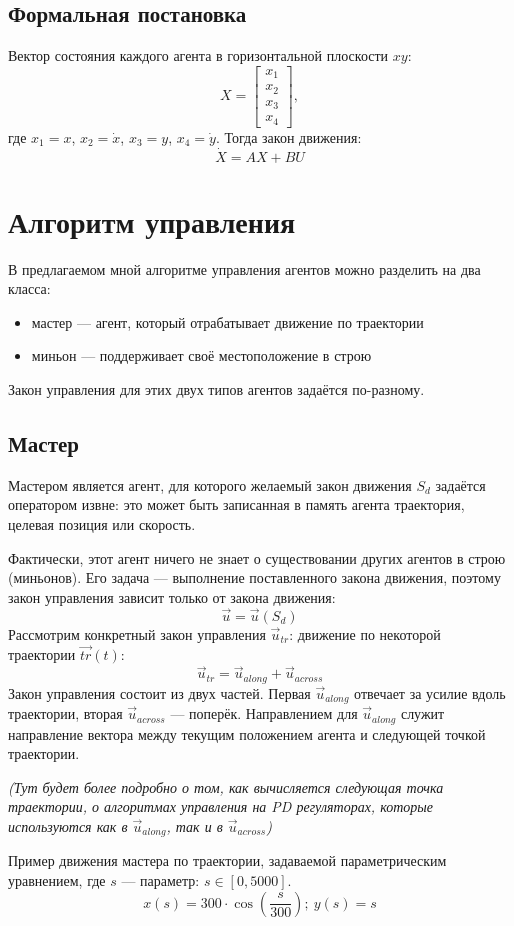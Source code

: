 \documentclass[12pt,a4paper]{article}
\begin{document}
\subsection{Формальная постановка}
Вектор состояния каждого агента в горизонтальной плоскости $xy$:
$$ X = 
\begin{bmatrix}
	x_1 \\
	x_2 \\
	x_3 \\
	x_4
\end{bmatrix} ,
$$
где $x_1 = x$, $x_2 = \dot{x}$, $x_3 = y$, $x_4 = \dot{y}$. Тогда закон движения:
$$\dot{X} = AX + BU$$

\section{Алгоритм управления}
В предлагаемом мной алгоритме управления агентов можно разделить на два класса:
\begin{itemize}
	\item мастер — агент, который отрабатывает движение по траектории
	\item миньон — поддерживает своё местоположение в строю
\end{itemize}
Закон управления для этих двух типов агентов задаётся по-разному.
\subsection{Мастер}
Мастером является агент, для которого желаемый закон движения $S_d$ задаётся оператором извне: это может быть записанная в память агента траектория, целевая позиция или скорость. \par
Фактически, этот агент ничего не знает о существовании других агентов в строю (миньонов). Его задача — выполнение поставленного закона движения, поэтому закон управления зависит только от закона движения:
$$ \vec{u} = \vec{u}(S_d)$$
Рассмотрим конкретный закон управления $\vec{u}_{tr}$: движение по некоторой траектории $\vec{tr}(t)$:
$$ \vec{u}_{tr} = \vec{u}_{along} + \vec{u}_{across} $$
Закон управления состоит из двух частей. Первая $\vec{u}_{along}$ отвечает за усилие вдоль траектории, вторая $\vec{u}_{across}$ — поперёк. Направлением для $\vec{u}_{along}$ служит направление вектора между текущим положением агента и следующей точкой траектории.
\begin{center}{\textit{ (Тут будет более подробно о том, как вычисляется следующая точка траектории, о алгоритмах управления на PD регуляторах, которые используются как в $\vec{u}_{along}$, так и в $\vec{u}_{across}$)}}
\end{center}
Пример движения мастера по траектории, задаваемой параметрическим уравнением, где $s$ — параметр: $s \in [0, 5000]$.
$$x(s) = 300 \cdot \cos(\frac{s}{300}); \ y(s) = s$$
\end{document}
